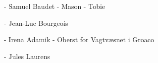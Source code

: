  - Samuel Baudet - Mason 
 - Tobie 

 - Jean-Luc Bourgeois

 - Irena Adamik - Oberst for Vagtvæsnet i Groaco

 - Jules Laurens